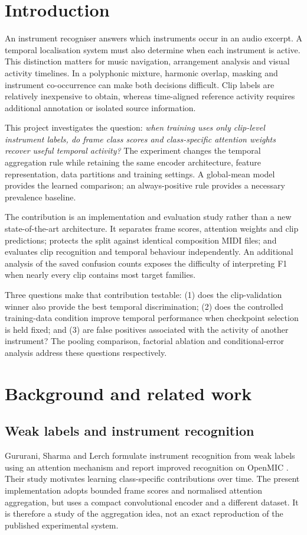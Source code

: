\documentclass[10pt,a4paper]{article}
\begin{document}
\section{Introduction}
An instrument recogniser answers which instruments occur in an audio excerpt. A temporal localisation system must also determine when each instrument is active. This distinction matters for music navigation, arrangement analysis and visual activity timelines. In a polyphonic mixture, harmonic overlap, masking and instrument co-occurrence can make both decisions difficult. Clip labels are relatively inexpensive to obtain, whereas time-aligned reference activity requires additional annotation or isolated source information.

This project investigates the question: \emph{when training uses only clip-level instrument labels, do frame class scores and class-specific attention weights recover useful temporal activity?} The experiment changes the temporal aggregation rule while retaining the same encoder architecture, feature representation, data partitions and training settings. A global-mean model provides the learned comparison; an always-positive rule provides a necessary prevalence baseline.

The contribution is an implementation and evaluation study rather than a new state-of-the-art architecture. It separates frame scores, attention weights and clip predictions; protects the split against identical composition MIDI files; and evaluates clip recognition and temporal behaviour independently. An additional analysis of the saved confusion counts exposes the difficulty of interpreting F1 when nearly every clip contains most target families.

Three questions make that contribution testable: (1) does the clip-validation winner also provide the best temporal discrimination; (2) does the controlled training-data condition improve temporal performance when checkpoint selection is held fixed; and (3) are false positives associated with the activity of another instrument? The pooling comparison, factorial ablation and conditional-error analysis address these questions respectively.

\section{Background and related work}
\subsection{Weak labels and instrument recognition}
Gururani, Sharma and Lerch formulate instrument recognition from weak labels using an attention mechanism and report improved recognition on OpenMIC \cite{attentionmic}. Their study motivates learning class-specific contributions over time. The present implementation adopts bounded frame scores and normalised attention aggregation, but uses a compact convolutional encoder and a different dataset. It is therefore a study of the aggregation idea, not an exact reproduction of the published experimental system.
\end{document}
